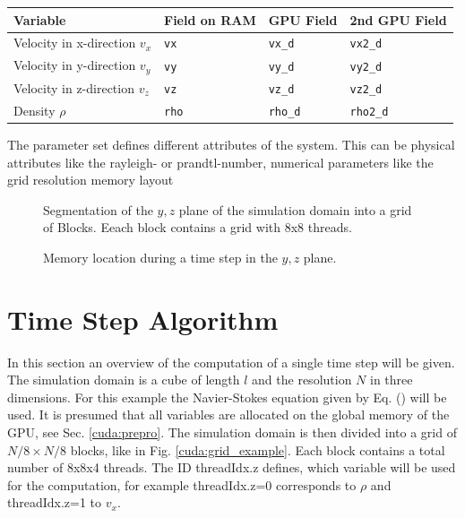 \begin{center}
    \begin{tabular}{ | l | l | l | l |}
    \hline
    Variable & Field on RAM & GPU Field & 2nd GPU Field \\
    \hline
    Velocity in x-direction $v_x$  & \texttt{vx}   &  \texttt{vx\_d}   & \texttt{vx2\_d}   \\
    Velocity in y-direction $v_y$  & \texttt{vy}   &  \texttt{vy\_d}   & \texttt{vy2\_d}   \\
    Velocity in z-direction $v_z$  & \texttt{vz}   &  \texttt{vz\_d}   & \texttt{vz2\_d}   \\
    Density  $\rho$  & \texttt{rho}  &  \texttt{rho\_d}  & \texttt{rho2\_d}  \\
    \hline
    \end{tabular}
\end{center}
The parameter set defines different attributes of the system.
This can be physical attributes like the rayleigh- or prandtl-number, numerical parameters like the grid resolution
memory layout

\clearpage


\begin{figure}[!bp]
      \centering
       \caption{Segmentation of the $y, z$ plane of the simulation domain into a grid of Blocks.
                 Eeach block contains a grid with 8x8 threads.}
       \label{cuda:stencil}
\end{figure}

\begin{figure}[!bp]
      \centering
       \caption{
           Memory location during a time step in the $y, z$ plane.
           }
       \label{cuda:timestep_algo_img}
\end{figure}

\clearpage
\section{Time Step Algorithm}

In this section an overview of the computation of a single time step will be given.
The simulation domain is a cube of length $l$ and the resolution $N$ in three dimensions.
For this example the Navier-Stokes equation given by Eq. () will be used.
It is presumed that all variables are allocated on the global memory of the GPU, see Sec. \ref{cuda:prepro}.
The simulation domain is then divided into a grid of  $N/8 \times N/8$ blocks, like in Fig. \ref{cuda:grid_example}.
Each block contains a total number of 8x8x4 threads.
The ID threadIdx.z defines, which variable will be used for the computation, for example threadIdx.z=0 corresponds to $\rho$ and threadIdx.z=1 to $v_x$.

